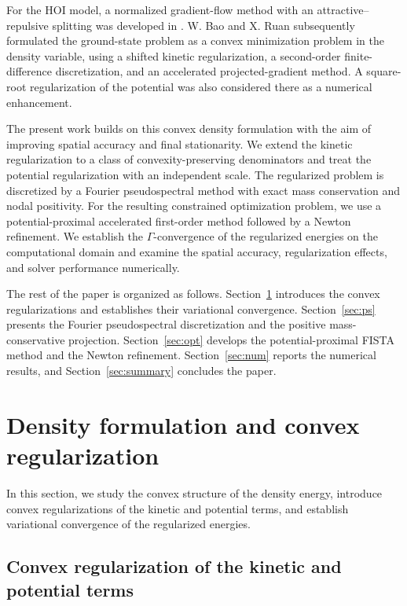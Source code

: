 \documentclass[11pt]{article}
\theoremstyle{plain}
\theoremstyle{definition}
\numberwithin{equation}{section}
\begin{document}
For the HOI model, a normalized gradient-flow method with an
attractive--repulsive splitting was developed in \cite{Ruan2018}.
W. Bao and X. Ruan \cite{BaoRuan2019} subsequently formulated the
ground-state problem as a convex minimization problem in the density
variable, using a shifted kinetic regularization, a second-order
finite-difference discretization, and an accelerated projected-gradient
method. A square-root regularization of the potential was also
considered there as a numerical enhancement.

The present work builds on this convex density formulation with the
aim of improving spatial accuracy and final stationarity. We extend
the kinetic regularization to a class of convexity-preserving
denominators and treat the potential regularization with an
independent scale. The regularized problem is discretized by a Fourier
pseudospectral method with exact mass conservation and nodal
positivity. For the resulting constrained optimization problem, we
use a potential-proximal accelerated first-order method followed by a
Newton refinement. We establish the $\Gamma$-convergence of the
regularized energies on the computational domain and examine the
spatial accuracy, regularization effects, and solver performance
numerically.

The rest of the paper is organized as follows.
Section~\ref{sec:density} introduces the convex regularizations and
establishes their variational convergence.
Section~\ref{sec:ps} presents the Fourier pseudospectral discretization
and the positive mass-conservative projection.
Section~\ref{sec:opt} develops the potential-proximal FISTA method and
the Newton refinement. Section~\ref{sec:num} reports the numerical
results, and Section~\ref{sec:summary} concludes the paper.

\section{Density formulation and convex regularization}
\label{sec:density}

In this section, we study the convex structure of the density energy,
introduce convex regularizations of the kinetic and potential terms,
and establish variational convergence of the regularized energies.


\subsection{Convex regularization of the kinetic and potential terms}
\end{document}

